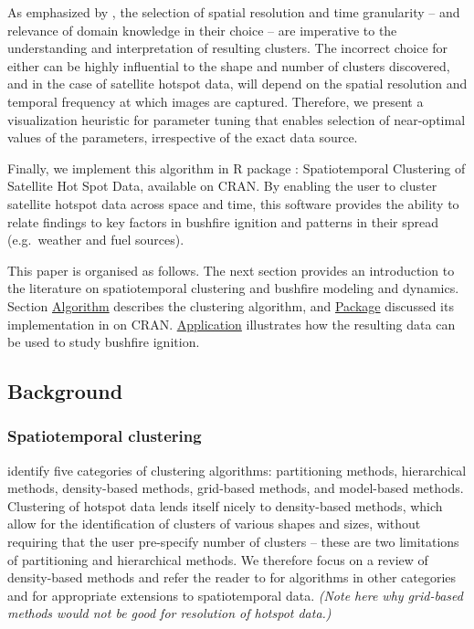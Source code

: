As emphasized by \citet{kisilevich2009spatio}, the selection of spatial
resolution and time granularity -- and relevance of domain knowledge in
their choice -- are imperative to the understanding and interpretation
of resulting clusters. The incorrect choice for either can be highly
influential to the shape and number of clusters discovered, and in the
case of satellite hotspot data, will depend on the spatial resolution
and temporal frequency at which images are captured. Therefore, we
present a visualization heuristic for parameter tuning that enables
selection of near-optimal values of the parameters, irrespective of the
exact data source.

Finally, we implement this algorithm in R package :
Spatiotemporal Clustering of Satellite Hot Spot Data, available on CRAN.
By enabling the user to cluster satellite hotspot data across space and
time, this software provides the ability to relate findings to key
factors in bushfire ignition and patterns in their spread (e.g.~weather
and fuel sources).

This paper is organised as follows. The next section provides an
introduction to the literature on spatiotemporal clustering and bushfire
modeling and dynamics. Section \protect\hyperlink{algorithm}{Algorithm}
describes the clustering algorithm, and
\protect\hyperlink{package}{Package} discussed its implementation in
 on CRAN. \protect\hyperlink{application}{Application}
illustrates how the resulting data can be used to study bushfire
ignition.

\hypertarget{background}{%
\subsection{Background}\label{background}}

\hypertarget{spatiotemporal-clustering}{%
\subsubsection{Spatiotemporal
clustering}\label{spatiotemporal-clustering}}

\citet{datamining2012} identify five categories of clustering
algorithms: partitioning methods, hierarchical methods, density-based
methods, grid-based methods, and model-based methods. Clustering of
hotspot data lends itself nicely to density-based methods, which allow
for the identification of clusters of various shapes and sizes, without
requiring that the user pre-specify number of clusters -- these are two
limitations of partitioning and hierarchical methods. We therefore focus
on a review of density-based methods and refer the reader to
\citet{datamining2012} for algorithms in other categories and
\citet{kisilevich2009spatio} for appropriate extensions to
spatiotemporal data. \emph{(Note here why grid-based methods would not
be good for resolution of hotspot data.)}

